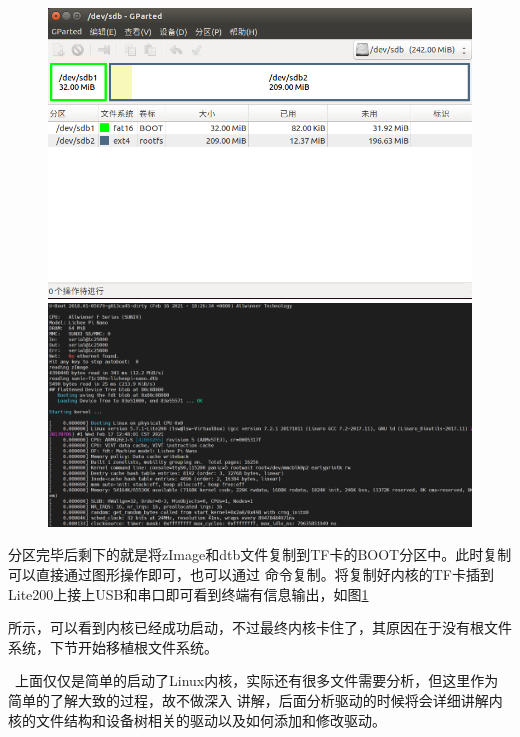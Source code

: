 \begin{figure}[htbp]
	\centering
	\begin{minipage}[c]{0.5\textwidth}
		\centering
		\includegraphics[width=0.98\linewidth]{chapter2/img/partedfinish}
		\caption{}
		\label{fig:partedfinish}
	\end{minipage}%
	\begin{minipage}[c]{0.5\textwidth}
		\centering
		\vspace{0.6cm}
		\includegraphics[width=0.98\linewidth]{chapter2/img/linuxsatrtfinish}
		\vspace{0.6cm}
		\caption{}
		\label{fig:linuxsatrtfinish}
	\end{minipage}
\end{figure}
分区完毕后剩下的就是将zImage和dtb文件复制到TF卡的BOOT分区中。此时复制可以直接通过图形操作即可，也可以通过
命令复制。将复制好内核的TF卡插到Lite200上接上USB和串口即可看到终端有信息输出，如图\ref{fig:linuxsatrtfinish}

所示，可以看到内核已经成功启动，不过最终内核卡住了，其原因在于没有根文件系统，下节开始移植根文件系统。
\begin{tcolorbox}[colback=red!5!white,colframe=red!75!black]
	\faWarning\  
	上面仅仅是简单的启动了Linux内核，实际还有很多文件需要分析，但这里作为简单的了解大致的过程，故不做深入
	讲解，后面分析驱动的时候将会详细讲解内核的文件结构和设备树相关的驱动以及如何添加和修改驱动。
\end{tcolorbox}



